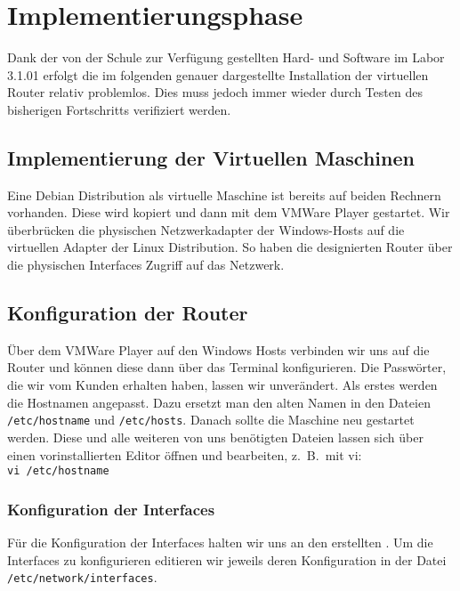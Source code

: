 \section{Implementierungsphase} 
\label{sec:Implementierungsphase}

Dank der von der Schule zur Verfügung gestellten Hard- und Software im Labor 3.1.01 erfolgt die im folgenden genauer dargestellte Installation der virtuellen Router relativ problemlos. Dies muss jedoch immer wieder durch Testen des bisherigen Fortschritts verifiziert werden. 

\subsection{Implementierung der Virtuellen Maschinen}
\label{subsec:ImplementierungVMs}
Eine Debian Distribution als virtuelle Maschine ist bereits auf beiden Rechnern vorhanden. Diese wird kopiert und dann mit dem VMWare Player gestartet. Wir überbrücken die physischen Netzwerkadapter der Windows-Hosts auf die virtuellen Adapter der Linux Distribution. So haben die designierten Router über die physischen Interfaces Zugriff auf das Netzwerk. 

\subsection{Konfiguration der Router}
\label{subsec:KonfigurationRouter}

Über dem VMWare Player auf den Windows Hosts verbinden wir uns auf die Router und können diese dann über das Terminal konfigurieren. Die Passwörter, die wir vom Kunden erhalten haben, lassen wir unverändert. Als erstes werden die Hostnamen angepasst. Dazu ersetzt man den alten Namen in den Dateien \texttt{/etc/hostname} und \texttt{/etc/hosts}. Danach sollte die Maschine neu gestartet werden.
Diese und alle weiteren von uns benötigten Dateien lassen sich über einen vorinstallierten Editor öffnen und bearbeiten, z.\ B.\ mit vi:\\
\noindent\hspace*{42mm} \texttt{vi /etc/hostname}

\subsubsection{Konfiguration der Interfaces}
\label{subsubsec:KonfigurationInsideRouterInt}
Für die Konfiguration der Interfaces halten wir uns an den erstellten . Um die Interfaces zu konfigurieren editieren wir jeweils deren Konfiguration in der Datei \texttt{/etc/network/interfaces}.

